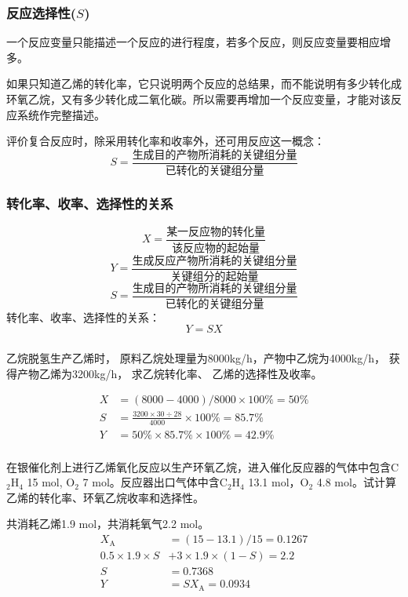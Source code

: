 \begin{frame}
    \frametitle{反应选择性($S$)}
    一个反应变量只能描述一个反应的进行程度，若多个反应，则反应变量要相应增多。
    \begin{center}

    \end{center}
    如果只知道乙烯的转化率，它只说明两个反应的总结果，而不能说明有多少转化成环氧乙烷，又有多少转化成二氧化碳。所以需要再增加一个反应变量，才能对该反应系统作完整描述。
    
    评价复合反应时，除采用转化率和收率外，还可用反应这一概念：
    \[
        S = \frac{\text{生成目的产物所消耗的关键组分量}}{\text{已转化的关键组分量}}
    \]
\end{frame}


\begin{frame}
    \frametitle{转化率、收率、选择性的关系}
    \[
      X = \frac{\text{某一反应物的转化量}}{\text{该反应物的起始量}}
    \]
    \[
        Y=\frac{\text{生成反应产物所消耗的关键组分量}}{\text{关键组分的起始量}}
    \]
    \[
        S = \frac{\text{生成目的产物所消耗的关键组分量}}{\text{已转化的关键组分量}}
    \]
    转化率、收率、选择性的关系：
    \[
        Y = SX
    \]
\end{frame}


\begin{frame}[t]
    \frametitle{}
    \begin{example}
      乙烷脱氢生产乙烯时， 原料乙烷处理量为8000kg/h，产物中乙烷为4000kg/h， 获得产物乙烯为3200kg/h， 求乙烷转化率、 乙烯的选择性及收率。
    \end{example}
    \pause
    \[
        \begin{aligned}
             X &= (8000-4000)/8000 \times 100\% = 50\%\\
             S &= \frac{3200\times 30 \div 28}{4000} \times 100\% = 85.7\%\\
             Y &= 50\% \times 85.7\% \times 100\% = 42.9\%
        \end{aligned}
    \]
\end{frame}


\begin{frame}[t]
    \frametitle{}
    \begin{example}
      在银催化剂上进行乙烯氧化反应以生产环氧乙烷，进入催化反应器的气体中包含C$_2$H$_4$ 15 mol, O$_2$ 7 mol。反应器出口气体中含C$_2$H$_4$ 13.1 mol，O$_2$ 4.8 mol。试计算乙烯的转化率、环氧乙烷收率和选择性。
    \end{example}
    \pause
    共消耗乙烯1.9 mol，共消耗氧气2.2 mol。
    \[
        \begin{aligned}
            X_\mathrm{A} &= (15-13.1)/15 = 0.1267 \\
            0.5\times 1.9\times S &+ 3\times 1.9\times(1-S) = 2.2 \\
            S &= 0.7368 \\
            Y &= SX_\mathrm{A} = 0.0934
        \end{aligned}
    \]
\end{frame}


